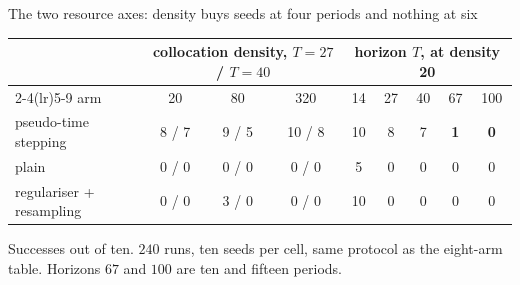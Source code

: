 \documentclass[aspectratio=169,10pt]{beamer}
\newcommand{\bad}[1]{{\color{warm}\textbf{#1}}}
\begin{document}
\begin{frame}[shrink=25]{The two resource axes: density buys seeds at four periods and nothing at six}
  \vspace{2mm}
  \centering\small
  \begin{tabular}{@{}lccc@{\hskip 3em}ccccc@{}}
    \toprule
    & \multicolumn{3}{c}{collocation density, $T = 27$ / $T = 40$}
    & \multicolumn{5}{c}{horizon $T$, at density 20} \\
    \cmidrule(lr){2-4}\cmidrule(lr){5-9}
    arm & 20 & 80 & 320 & 14 & 27 & 40 & 67 & 100 \\
    \midrule
    pseudo-time stepping & 8 / 7 & 9 / 5 & 10 / 8 & 10 & 8 & 7 & \bad{1} & \bad{0} \\
    plain & 0 / 0 & 0 / 0 & 0 / 0 & 5 & 0 & 0 & 0 & 0 \\
    regulariser + resampling & 0 / 0 & 3 / 0 & 0 / 0 & 10 & 0 & 0 & 0 & 0 \\
    \bottomrule
  \end{tabular}
  \vspace{1mm}

  {\scriptsize Successes out of ten. $240$ runs, ten seeds per cell, same
   protocol as the eight-arm table. Horizons $67$ and $100$ are ten and fifteen
   periods.}
  \vspace{3mm}


\end{frame}
\end{document}
